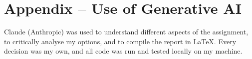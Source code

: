 \section*{Appendix -- Use of Generative AI}

Claude (Anthropic) was used to understand different aspects of the assignment, to critically analyse my options, and to compile the report in \LaTeX. Every decision was my own, and all code was run and tested locally on my machine.

